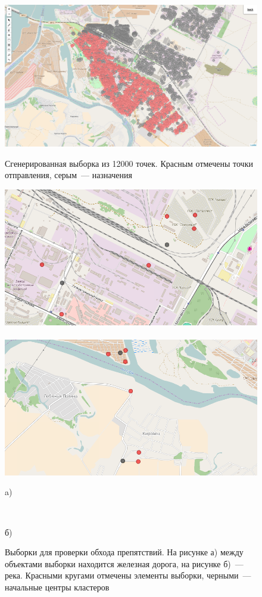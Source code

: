 \documentclass[a4paper, 14pt]{extreport}
\begin{document}
\begin{figure}[ht!]
    \centering
    \includegraphics[width=.9\textwidth]{full} \\[1ex]
    \parbox{.9\textwidth}{\caption{Сгенерированная выборка из 12000 точек. Красным отмечены точки отправления, серым~--- назначения} \label{pic:full}}
    \vspace*{-1ex}
\end{figure}

\begin{figure}[t!]
    \centering
    \includegraphics[width=.47\textwidth]{test_railway-contrast}\
    \includegraphics[width=.47\textwidth]{test_river-contrast} \\
    \parbox{.47\textwidth}{\small\centering a)}\ \parbox{.47\textwidth}{\small\centering б)}
    \parbox{.9\textwidth}{\caption{Выборки для проверки обхода препятствий. На рисунке а) между объектами выборки находится железная дорога, на рисунке б)~--- река. Красными кругами отмечены элементы выборки, черными~--- начальные центры кластеров} \label{pic:railway-river}}
    \vspace*{-1ex}
\end{figure}
\end{document}

